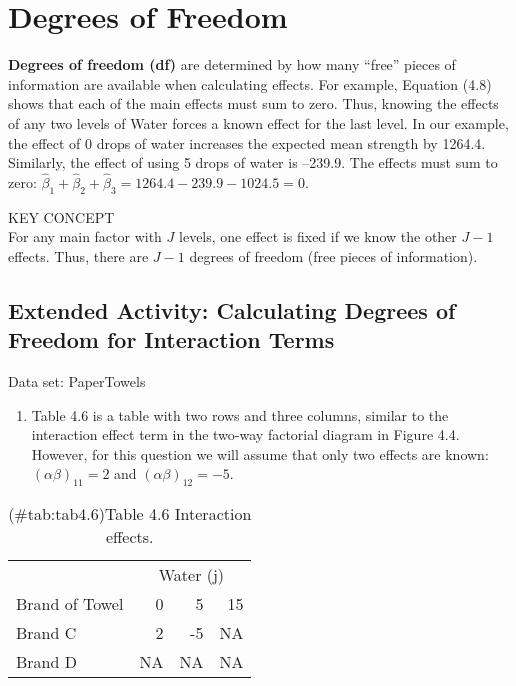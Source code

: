 \documentclass[
]{report}
\providecommand{\tightlist}{%
  \setlength{\itemsep}{0pt}\setlength{\parskip}{0pt}}
\theoremstyle{definition}
\theoremstyle{definition}
\theoremstyle{definition}
\theoremstyle{definition}
\theoremstyle{remark}
\begin{document}
\hypertarget{degrees-of-freedom}{%
\section{Degrees of Freedom}\label{degrees-of-freedom}}

\textbf{Degrees of freedom (df)} are determined by how many ``free'' pieces of information are available when calculating effects. For example, Equation (4.8) shows that each of the main effects must sum to zero. Thus, knowing the effects of any two levels of Water forces a known effect for the last level. In our example, the effect of 0 drops of water increases the expected mean strength by 1264.4. Similarly, the effect of using 5 drops of water is --239.9. The effects must sum to zero: \(\hat\beta_1 + \hat\beta_2 + \hat\beta_3 = 1264.4 - 239.9 - 1024.5 = 0.\)

KEY CONCEPT\\
For any main factor with \(J\) levels, one effect is fixed if we know the other \(J-1\) effects. Thus, there are \(J-1\) degrees of freedom (free pieces of information).

\hypertarget{extended-activity-calculating-degrees-of-freedom-for-interaction-terms}{%
\subsection{Extended Activity: Calculating Degrees of Freedom for Interaction Terms}\label{extended-activity-calculating-degrees-of-freedom-for-interaction-terms}}

Data set: PaperTowels

\begin{enumerate}
\def\labelenumi{\arabic{enumi}.}
\setcounter{enumi}{30}
\tightlist
\item
  Table 4.6 is a table with two rows and three columns, similar to the interaction effect term in the two-way factorial diagram in Figure 4.4. However, for this question we will assume that only two effects are known: \((\alpha\beta)_{11}=2\) and \((\alpha\beta)_{12}=-5\).
\end{enumerate}

\begin{table}[!h]
\centering
\caption{(\#tab:tab4.6)Table 4.6 Interaction effects.}
\centering
\begin{tabular}[t]{lrrr}
\toprule
\multicolumn{1}{c}{ } & \multicolumn{3}{c}{Water (j)} \\
\cmidrule(l{3pt}r{3pt}){2-4}
Brand of Towel & 0 & 5 & 15\\
\midrule
Brand C & 2 & -5 & NA\\
Brand D & NA & NA & NA\\
\bottomrule
\end{tabular}
\end{table}
\end{document}
